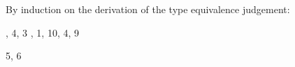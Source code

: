 By induction on the derivation of the type equivalence judgement:

\begin{bycase}

\Case{\Rtedef}
\begin{derivation}
\step{\tdefO\in\cx}{\premof{\Rtedef}}
\step{\cxwfO}{\premof{\Rtedef}}
     {, 4, 3}
\step{\istyO{\tsbslash{\typ}{\tvarS}{\typS}}}
     {, 1, 10, 4, 9}
\end{derivation}

\Case{\Rterefl}
\StepO{\istyO{\typ}}{\premof{\Rterefl}}

\Case{\Rtesymm}
\begin{derivation}
\end{derivation}

\Case{\Rtetrans}
\begin{derivation}
\end{derivation}

\Case{\Rteinst}
\begin{derivation}
\step{\istyO{\tinstO}}{\premof{\Rteinst}}
\step{\cxwfO}{\thmref{thm-cxwf}, 1}
\end{derivation}

\Case{\Rtearr}
\begin{derivation}
     {5, 6}
\end{derivation}


\end{bycase}
